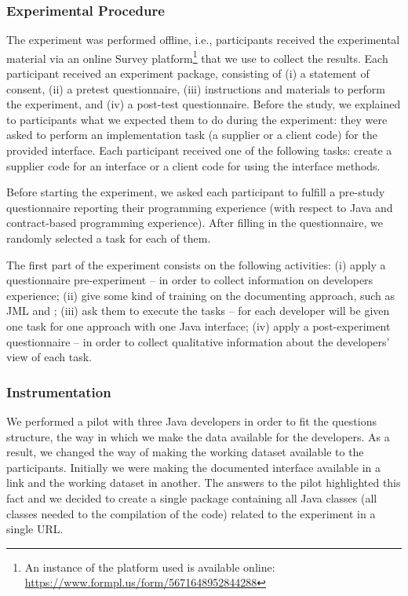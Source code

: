 \subsubsection{Experimental Procedure}
\label{sec:expProcedure}

The experiment was performed offline, i.e., participants received the
experimental material via an online Survey
platform\footnote{An instance
of the platform used is
available online: \url{https://www.formpl.us/form/5671648952844288}} that we use
to collect the results.
Each
participant received an experiment package, consisting of (i) a statement of consent, (ii) a pretest
questionnaire, (iii) instructions and materials to perform the experiment, and (iv) a post-test
questionnaire. Before the study, we explained to participants what we expected them to do during the
experiment: they were asked to perform an implementation task (a supplier or a client code) for the
provided interface. Each participant received one of the following tasks: create a supplier code for
an interface or a client code for using the interface methods.

Before starting the experiment, we asked each participant to fulfill a
pre-study questionnaire reporting their programming experience (with respect to Java and contract-based programming
experience). After filling in the questionnaire, we randomly selected a task for
each of them.

The first part of the experiment consists
on the following activities: (i) apply a questionnaire pre-experiment -- in order to collect
information on developers experience; (ii) give some kind of training on the documenting approach,
such as JML and \contractjdoc{}; (iii) ask them to execute the tasks -- for each developer will be
given one task for one approach with one Java interface; (iv) apply a post-experiment 
questionnaire -- in order to collect qualitative information about the developers' view of each task.

\subsubsection{Instrumentation}
\label{sec:expInstrumentation}

We performed a pilot with three Java developers in order to fit the
questions structure, the way in which we make the data
available for the developers. As a result, we changed the way of making the
working dataset available to the participants. Initially we were making the documented interface available in a link and the working dataset in another. The
answers to the pilot highlighted this fact and we decided to create a single package containing all
Java classes (all classes needed to the compilation of the code) related to the experiment in a
single URL.

